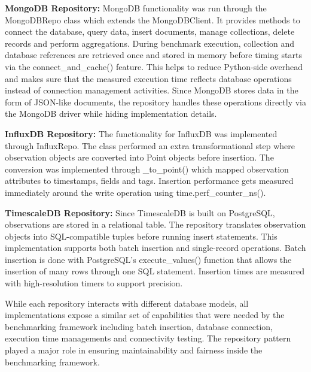 \textbf{MongoDB Repository:}
MongoDB functionality was run through the MongoDBRepo class which extends the MongoDBClient. It provides methods to connect the database, query data, insert documents, manage collections, delete records and perform aggregations. During benchmark execution, collection and database references are retrieved once and stored in memory before timing starts via the connect\_and\_cache() feature. This helps to reduce Python-side overhead and makes sure that the measured execution time reflects database operations instead of connection management activities. Since MongoDB stores data in the form of JSON-like documents, the repository handles these operations directly via the MongoDB driver while hiding implementation details. 

\textbf{InfluxDB Repository:}
The functionality for InfluxDB was implemented through InfluxRepo. The class performed an extra transformational step where observation objects are converted into Point objects before insertion. The conversion was implemented through \_to\_point() which mapped observation attributes to timestamps, fields and tags. Insertion performance gets measured immediately around the write operation using time.perf\_counter\_ns(). 


\textbf{TimescaleDB Repository:}
Since TimescaleDB is built on PostgreSQL, observations are stored in a relational table. The repository translates observation objects into SQL-compatible tuples before running insert statements. This implementation supports both batch insertion and single-record operations. Batch insertion is done with PostgreSQL’s execute\_values() function that allows the insertion of many rows through one SQL statement. Insertion times are measured with high-resolution timers to support precision. 

While each repository interacts with different database models, all implementations expose a similar set of capabilities that were needed by the benchmarking framework including batch insertion, database connection, execution time managements and connectivity testing. The repository pattern played a major role in ensuring maintainability and fairness inside the benchmarking framework. 


